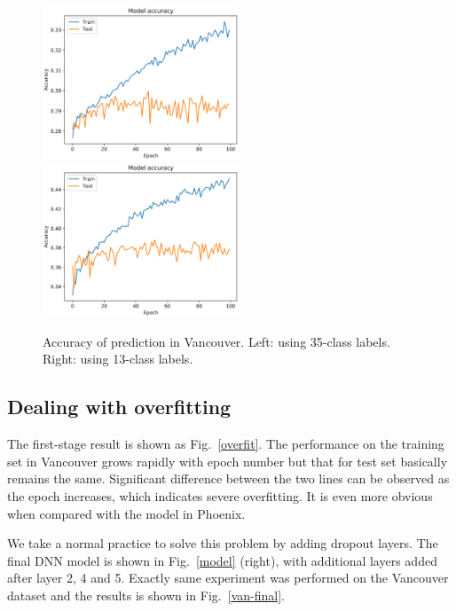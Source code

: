 \documentclass[runningheads]{llncs}
\begin{document}
\begin{figure}
    \centering
    \includegraphics[width=2.3in]{vancouver-overfitting.eps}
    \includegraphics[width=2.3in]{vancouver-overfitting-after.eps}
    \caption{Accuracy of prediction in Vancouver. Left: using 35-class labels. Right: using 13-class labels.} \label{combine-label}
\end{figure}


\subsection{Dealing with overfitting}

The first-stage result is shown as Fig.~\ref{overfit}. The performance on the training set in Vancouver grows rapidly with epoch number but that for test set basically remains the same. Significant difference between the two lines can be observed as the epoch increases, which indicates severe overfitting. It is even more obvious when compared with the model in Phoenix.

We take a normal practice to solve this problem by adding dropout layers. The final DNN model is shown in Fig.~\ref{model} (right), with additional layers added after layer 2, 4 and 5. Exactly same experiment was performed on the Vancouver dataset and the results is shown in Fig.~\ref{van-final}.
\end{document}

